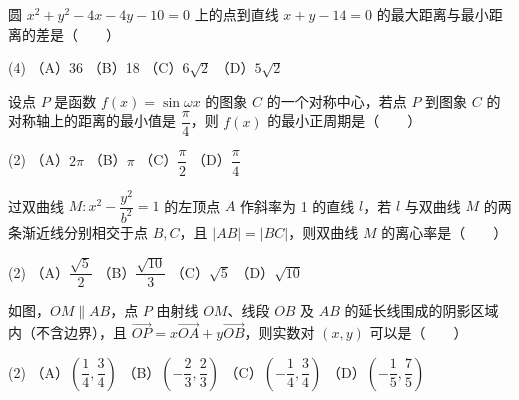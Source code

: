 \begin{question}
圆 $x^2+y^2-4x-4y-10=0$ 上的点到直线 $x+y-14=0$ 的最大距离与最小距离的差是\mbox{（　　）}

\begin{gkopts}(4)
\task （A）36
\task （B）18
\task （C）$6\sqrt2$
\task （D）$5\sqrt2$
\end{gkopts}

\end{question}
\begin{question}
设点 $P$ 是函数 $f(x)=\sin\omega x$ 的图象 $C$ 的一个对称中心，若点 $P$ 到图象 $C$ 的对称轴上的距离的最小值是 $\dfrac{\pi}{4}$，则 $f(x)$ 的最小正周期是\mbox{（　　）}

\begin{gkopts}(2)
\task （A）$2\pi$
\task （B）$\pi$
\task （C）$\dfrac{\pi}{2}$
\task （D）$\dfrac{\pi}{4}$
\end{gkopts}

\end{question}
\begin{question}
过双曲线 $M:x^2-\dfrac{y^2}{b^2}=1$ 的左顶点 $A$ 作斜率为 1 的直线 $l$，若 $l$ 与双曲线 $M$ 的两条渐近线分别相交于点 $B,C$，且 $|AB|=|BC|$，则双曲线 $M$ 的离心率是\mbox{（　　）}

\begin{gkopts}(2)
\task （A）$\dfrac{\sqrt5}{2}$
\task （B）$\dfrac{\sqrt{10}}{3}$
\task （C）$\sqrt5$
\task （D）$\sqrt{10}$
\end{gkopts}

\Needspace{0.4\textheight}
\end{question}
\begin{question}
如图，$OM\parallel AB$，点 $P$ 由射线 $OM$、线段 $OB$ 及 $AB$ 的延长线围成的阴影区域内（不含边界），且 $\overrightarrow{OP}=x\overrightarrow{OA}+y\overrightarrow{OB}$，则实数对 $(x,y)$ 可以是\mbox{（　　）}

\begin{gkopts}(2)
\task （A）$\left(\dfrac14,\dfrac34\right)$
\task （B）$\left(-\dfrac23,\dfrac23\right)$
\task （C）$\left(-\dfrac14,\dfrac34\right)$
\task （D）$\left(-\dfrac15,\dfrac75\right)$
\end{gkopts}
\nopagebreak[4]
\begin{center}\end{center}
\nopagebreak[4]
\end{question}

